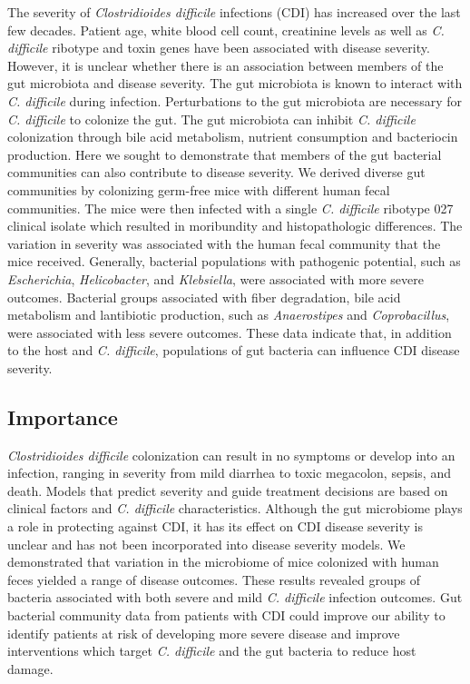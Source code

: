 \documentclass[
  12pt,
]{article}
\begin{document}
The severity of \emph{Clostridioides difficile} infections (CDI) has
increased over the last few decades. Patient age, white blood cell
count, creatinine levels as well as \emph{C. difficile} ribotype and
toxin genes have been associated with disease severity. However, it is
unclear whether there is an association between members of the gut
microbiota and disease severity. The gut microbiota is known to interact
with \emph{C. difficile} during infection. Perturbations to the gut
microbiota are necessary for \emph{C. difficile} to colonize the gut.
The gut microbiota can inhibit \emph{C. difficile} colonization through
bile acid metabolism, nutrient consumption and bacteriocin production.
Here we sought to demonstrate that members of the gut bacterial
communities can also contribute to disease severity. We derived diverse
gut communities by colonizing germ-free mice with different human fecal
communities. The mice were then infected with a single \emph{C.
difficile} ribotype 027 clinical isolate which resulted in moribundity
and histopathologic differences. The variation in severity was
associated with the human fecal community that the mice received.
Generally, bacterial populations with pathogenic potential, such as
\emph{Escherichia}, \emph{Helicobacter}, and \emph{Klebsiella}, were
associated with more severe outcomes. Bacterial groups associated with
fiber degradation, bile acid metabolism and lantibiotic production, such
as \emph{Anaerostipes} and \emph{Coprobacillus}, were associated with
less severe outcomes. These data indicate that, in addition to the host
and \emph{C. difficile}, populations of gut bacteria can influence CDI
disease severity.

\hypertarget{importance}{%
\subsection{Importance}\label{importance}}

\emph{Clostridioides difficile} colonization can result in no symptoms
or develop into an infection, ranging in severity from mild diarrhea to
toxic megacolon, sepsis, and death. Models that predict severity and
guide treatment decisions are based on clinical factors and \emph{C.
difficile} characteristics. Although the gut microbiome plays a role in
protecting against CDI, it has its effect on CDI disease severity is
unclear and has not been incorporated into disease severity models. We
demonstrated that variation in the microbiome of mice colonized with
human feces yielded a range of disease outcomes. These results revealed
groups of bacteria associated with both severe and mild \emph{C.
difficile} infection outcomes. Gut bacterial community data from
patients with CDI could improve our ability to identify patients at risk
of developing more severe disease and improve interventions which target
\emph{C. difficile} and the gut bacteria to reduce host damage.
\end{document}
